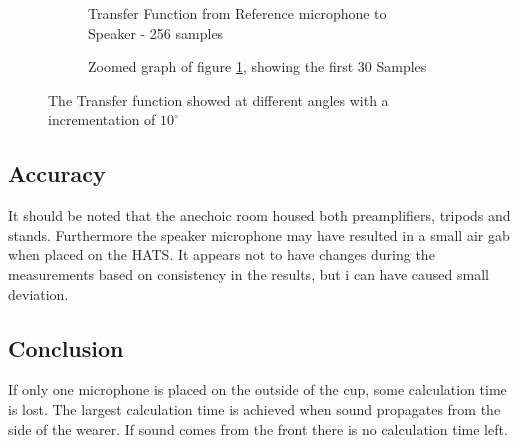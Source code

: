 \begin{figure}[H]
	\centering
	\begin{subfigure}[b]{\textwidth}
	
	\label{Fig:AngOfIncTime}
	\caption{Transfer Function from Reference microphone to Speaker - 256 samples}
	\end{subfigure} 
	\begin{subfigure}[b]{\textwidth}
	
	\label{Fig:AngOfIncTimezoom}
	\caption{Zoomed graph of figure \ref{Fig:AngOfIncTime}, showing the first 30 Samples}
	\end{subfigure}
	\caption{The Transfer function showed at different angles with a incrementation of $10^{\circ}$}
	\label{fig:AngOfIncResult}
\end{figure}


\subsection{Accuracy}

It should be noted that the anechoic room housed both preamplifiers, tripods and stands. Furthermore the speaker microphone may have resulted in a small air gab when placed on the HATS. It appears not to have changes during the measurements based on consistency in the results, but i can have caused small deviation.

\subsection{Conclusion}
If only one microphone is placed on the outside of the cup, some calculation time is lost. The largest calculation time is achieved when sound propagates from the side of the wearer. If sound comes from the front there is no calculation time left. 